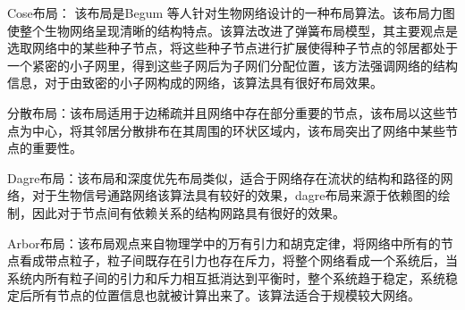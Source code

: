 Cose布局： 该布局是Begum\cite{An algorithm for automated layout of process description maps drawn in SBGN} 等人针对生物网络设计的一种布局算法。该布局力图使整个生物网络呈现清晰的结构特点。该算法改进了弹簧布局\cite{Spring layout}模型，其主要观点是选取网络中的某些种子节点，将这些种子节点进行扩展使得种子节点的邻居都处于一个紧密的小子网里，得到这些子网后为子网们分配位置，该方法强调网络的结构信息，对于由致密的小子网构成的网络，该算法具有很好布局效果。

分散布局：该布局适用于边稀疏并且网络中存在部分重要的节点，该布局以这些节点为中心，将其邻居分散排布在其周围的环状区域内，该布局突出了网络中某些节点的重要性。

Dagre布局：该布局和深度优先布局类似，适合于网络存在流状的结构和路径的网络，对于生物信号通路网络该算法具有较好的效果，dagre布局来源于依赖图的绘制，因此对于节点间有依赖关系的结构网路具有很好的效果。

Arbor布局：该布局观点来自物理学中的万有引力和胡克定律，将网络中所有的节点看成带点粒子，粒子间既存在引力也存在斥力，将整个网络看成一个系统后，当系统内所有粒子间的引力和斥力相互抵消达到平衡时，整个系统趋于稳定，系统稳定后所有节点的位置信息也就被计算出来了。该算法适合于规模较大网络。

